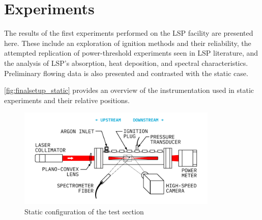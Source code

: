 \chapter{Experiments}
    The results of the first experiments performed on the LSP facility are presented here. These include an exploration of ignition methods and their reliability, the attempted replication of power-threshold experiments seen in LSP literature, and the analysis of LSP's absorption, heat deposition, and spectral characteristics. Preliminary flowing data is also presented and contrasted with the static case.

    \autoref{fig:finalsetup_static} provides an overview of the instrumentation used in static experiments and their relative positions. 

    \begin{figure}[h]
        \centering
        \includegraphics[width=0.85\textwidth]{assets/5 results/finalsetup_static}
        \caption{Static configuration of the test section}
        \label{fig:finalsetup_static}
    \end{figure}

